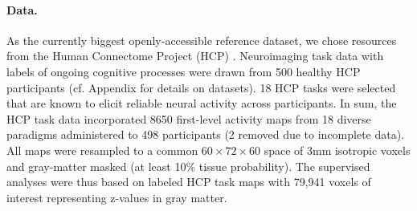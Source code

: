 \documentclass{article}
\begin{document}
%
\paragraph{Data.}
As the currently biggest openly-accessible reference dataset,
we chose resources from the Human Connectome Project (HCP)
\cite{barch2013}.
Neuroimaging task data with labels of ongoing cognitive processes
were drawn from 500
healthy HCP participants (cf. Appendix for details on datasets).
18 HCP tasks 
were selected that are known to elicit reliable neural activity
across participants.
In sum, the HCP task data incorporated 8650 first-level activity maps
from 18 diverse paradigms administered to 498 participants (2 removed
due to incomplete data).
All maps were resampled to a common $60\times72\times60$ space of
3mm isotropic voxels and gray-matter masked (at least 10\% tissue
probability).
The supervised analyses were thus based on labeled HCP task maps with
79,941 voxels of interest representing z-values in gray matter.
\end{document}
